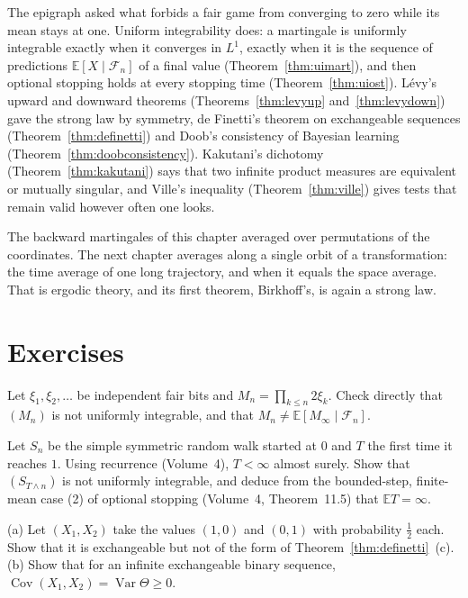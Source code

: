 The epigraph asked what forbids a fair game from converging to zero while its mean stays at one. Uniform integrability does: a martingale is
uniformly integrable exactly when it converges in $L^1$, exactly when it is the sequence of predictions $\mathbb E[X\mid\mathcal F_n]$ of a final value
(Theorem~\ref{thm:uimart}), and then optional stopping holds at every stopping time (Theorem~\ref{thm:uiost}). L\'evy's upward and downward theorems
(Theorems~\ref{thm:levyup} and~\ref{thm:levydown}) gave the strong law by symmetry, de Finetti's theorem on exchangeable sequences
(Theorem~\ref{thm:definetti}) and Doob's consistency of Bayesian learning (Theorem~\ref{thm:doobconsistency}). Kakutani's dichotomy
(Theorem~\ref{thm:kakutani}) says that two infinite product measures are equivalent or mutually singular, and Ville's inequality
(Theorem~\ref{thm:ville}) gives tests that remain valid however often one looks.

The backward martingales of this chapter averaged over permutations of the coordinates. The next chapter averages along a single orbit of a
transformation: the time average of one long trajectory, and when it equals the space average. That is ergodic theory, and its first theorem, Birkhoff's,
is again a strong law.

\section{Exercises}

\begin{exercise}[$\star$]\label{ex:doubling}
Let $\xi_1,\xi_2,\dots$ be independent fair bits and $M_n=\prod_{k\le n}2\xi_k$. Check directly that $(M_n)$ is not uniformly integrable, and that $M_n\neq\mathbb E[M_\infty\mid\mathcal F_n]$.
\end{exercise}

\begin{exercise}[$\star$]\label{ex:symwalk}
Let $S_n$ be the simple symmetric random walk started at $0$ and $T$ the first time it reaches $1$. Using recurrence (Volume~4), $T<\infty$ almost surely. Show that $(S_{T\wedge n})$ is not uniformly integrable,
and deduce from the bounded-step, finite-mean case (2) of optional stopping (Volume~4, Theorem~11.5) that $\mathbb ET=\infty$.
\end{exercise}

\begin{exercise}[$\star$]\label{ex:finiteexch}
(a) Let $(X_1,X_2)$ take the values $(1,0)$ and $(0,1)$ with probability $\frac12$ each. Show that it is exchangeable but not of the form of Theorem~\ref{thm:definetti}~(c).
(b) Show that for an infinite exchangeable binary sequence, $\operatorname{Cov}(X_1,X_2)=\operatorname{Var}\Theta\ge0$.
\end{exercise}

